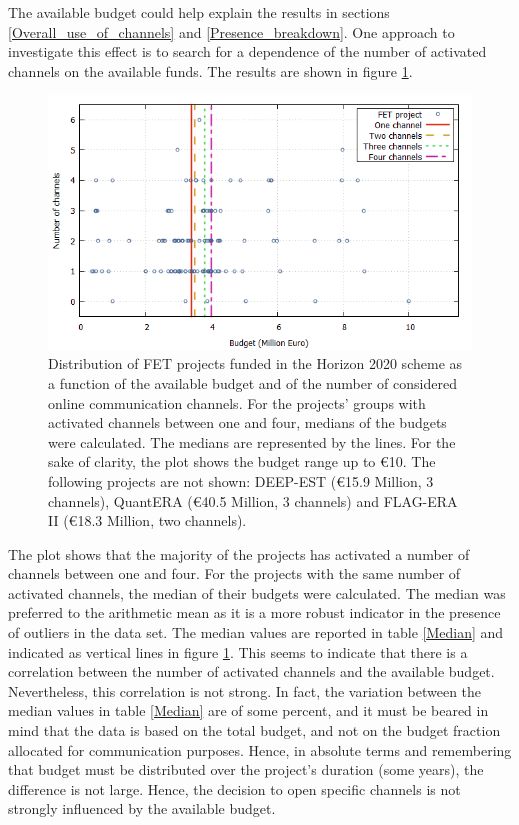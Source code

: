 The available budget could help explain the results in sections \ref{Overall_use_of_channels} and \ref{Presence_breakdown}. One approach to investigate this effect is to search for a dependence of the number of activated channels on the available funds. The results are shown in figure \ref{Channel_budget}.  

\begin{figure}[!t] 
 \begin{center}
 \includegraphics[scale=0.4]{Images/Channel_budget.png}
 \caption{Distribution of FET projects funded in the Horizon 2020 scheme as a function of the available budget and of the number of considered online communication channels. For the projects' groups with activated channels between one and four, medians of the budgets were calculated. The medians are represented by the lines. For the sake of clarity, the plot shows the budget range up to \euro 10. The following projects are not shown: DEEP-EST (\euro 15.9 Million, 3 channels), QuantERA (\euro 40.5 Million, 3 channels) and FLAG-ERA II (\euro 18.3 Million, two channels).}
 \label{Channel_budget}
 \end{center}
\end{figure}

The plot shows that the majority of the projects has activated a number of channels between one and four. For the projects with the same number of activated channels, the median of their budgets were calculated. The median was preferred to the arithmetic mean as it is a more robust indicator in the presence of outliers in the data set. The median values are reported in table \ref{Median} and indicated as vertical lines in figure \ref{Channel_budget}. This seems to indicate that there is a correlation between the number of activated channels and the available budget. Nevertheless, this correlation is not strong. In fact, the variation between the median values in table \ref{Median} are of some percent, and it must be beared in mind that the data is based on the total budget, and not on the budget fraction allocated for communication purposes. Hence, in absolute terms and remembering that budget must be distributed over the project's duration (some years), the difference is not large. Hence, the decision to open specific channels is not strongly influenced by the available budget.  

